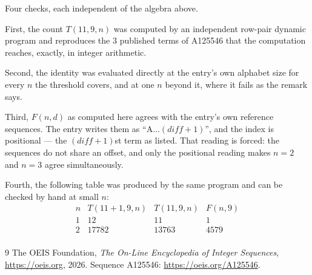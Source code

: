 \documentclass[11pt,a4paper]{article}
\theoremstyle{plain}
\theoremstyle{definition}
\begin{document}
Four checks, each independent of the algebra above.

First, the count $T(11,9,n)$ was computed by an independent row-pair dynamic program and
reproduces the $3$ published terms of A125546 that the computation reaches,
exactly, in integer arithmetic.

Second, the identity was evaluated directly at the entry's own alphabet size for every $n$ the
threshold covers, and at one $n$ beyond it, where it fails as the remark says.

Third, $F(n,d)$ as computed here agrees with the entry's own reference sequences. The entry
writes them as ``$\mathrm{A}\dots(\mathit{diff}+1)$'', and the index is positional --- the
$(\mathit{diff}+1)$st term as listed. That reading is forced: the sequences do not share an
offset, and only the positional reading makes $n=2$ and $n=3$ agree simultaneously.

Fourth, the following table was produced by the same program and can be checked by hand at
small $n$:
\[
\begin{array}{rrrr}
n & T(11+1,9,n) & T(11,9,n) & F(n,9) \\ \hline
1 & 12 & 11 & 1 \\
2 & 17782 & 13763 & 4579 \\
\end{array}
\]

\begin{thebibliography}{9}
 The OEIS Foundation, \emph{The On-Line Encyclopedia of Integer Sequences},
\url{https://oeis.org}, 2026. Sequence A125546: \url{https://oeis.org/A125546}.
\end{thebibliography}
\end{document}
